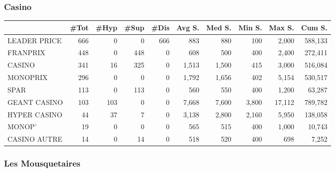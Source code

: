 \documentclass[11pt]{article}
\begin{document}
\subsubsection{Casino}

\begin{table}[H]
\footnotesize
\setlength{\tabcolsep}{2pt}

\begin{tabular}{lrrrrrrrrr}
\toprule
{} &       \#Tot &       \#Hyp &       \#Sup &       \#Dis &     Avg S. &     Med S. &     Min S. &     Max S. &     Cum S. \\
\midrule
LEADER PRICE &        666 &          0 &          0 &        666 &        883 &        880 &        100 &      2,000 &    588,133 \\
FRANPRIX     &        448 &          0 &        448 &          0 &        608 &        500 &        400 &      2,400 &    272,411 \\
CASINO       &        341 &         16 &        325 &          0 &      1,513 &      1,500 &        415 &      3,000 &    516,084 \\
MONOPRIX     &        296 &          0 &          0 &          0 &      1,792 &      1,656 &        402 &      5,154 &    530,517 \\
SPAR         &        113 &          0 &        113 &          0 &        560 &        550 &        400 &      1,200 &     63,287 \\
GEANT CASINO &        103 &        103 &          0 &          0 &      7,668 &      7,600 &      3,800 &     17,112 &    789,782 \\
HYPER CASINO &         44 &         37 &          7 &          0 &      3,138 &      2,800 &      2,160 &      5,950 &    138,058 \\
MONOP'       &         19 &          0 &          0 &          0 &        565 &        515 &        400 &      1,000 &     10,743 \\
CASINO AUTRE &         14 &          0 &         14 &          0 &        518 &        520 &        400 &        698 &      7,252 \\
\bottomrule
\end{tabular}

\end{table}

\subsubsection{Les Mousquetaires}
\end{document}
